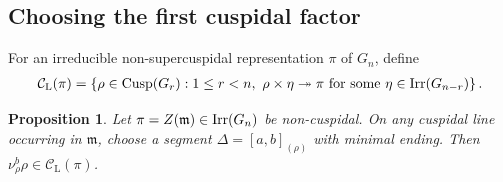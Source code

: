 \documentclass[11pt,leqno]{amsart}
\numberwithin{equation}{section}
\theoremstyle{plain}
\newtheorem{proposition}[theorem]{Proposition}
\theoremstyle{definition}
\theoremstyle{remark}
\DeclareMathOperator{\Irr}{Irr}
\newcommand{\cl}{\mathcal{C}_{\mathrm{L}}}
\newcommand{\onto}{\twoheadrightarrow}
\begin{document}
	\subsection{Choosing the first cuspidal factor}
	For an irreducible non-supercuspidal representation $\pi$ of $G_n$,
	define
	\begin{align*}
		\cl(\pi)=
		\left\{\rho\in {\rm Cusp}(G_r):
		1\le r<n,\ 
		\rho\times\eta\onto\pi
		\text{ for some }\eta\in \Irr(G_{n-r})\right\}.
	\end{align*}
	
	\begin{proposition}\label{lem:endpoint}
		Let $\pi=Z(\mathfrak m)\in {\rm Irr}(G_n)$ be non-cuspidal.
		On any cuspidal line occurring in $\mathfrak m$, choose a segment $\Delta=[a,b]_{(\rho)}$ with minimal ending.
		Then $\nu_\rho^b\rho\in\cl(\pi)$. 
	\end{proposition}
	
\end{document}
